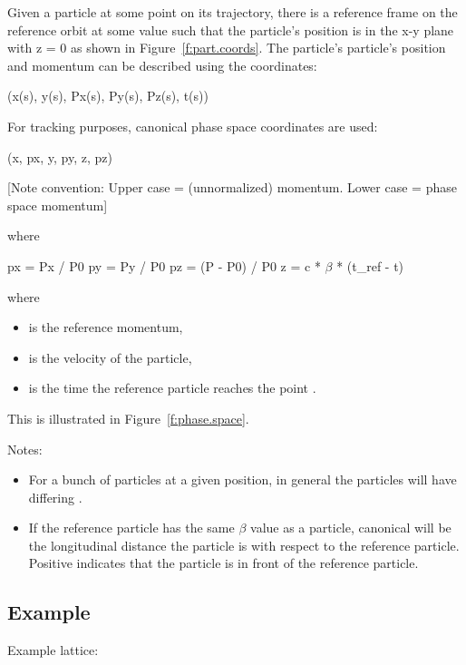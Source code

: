 \documentclass{hitec}
\begin{document}
Given a particle at some point on its trajectory, there is a reference frame on the reference orbit
at some  value such that the particle's position is in the x-y plane with z = 0 as shown
in Figure~\ref{f:part.coords}. The
particle's particle's position and momentum  can be described using the coordinates:
{\small
\begin{code}
    (x(s), y(s), Px(s), Py(s), Pz(s), t(s))
\end{code}}

For tracking purposes, canonical phase space coordinates are used:
{\small
\begin{code}
    (x, px, y, py, z, pz)   
\end{code}}
[Note convention: Upper case  = (unnormalized) momentum. Lower case  = phase space momentum]

where
{\small
\begin{code}
    px = Px / P0
    py = Py / P0
    pz = (P - P0) / P0
    z  = c * $\beta$ * (t_ref - t)
\end{code}}

where 
\begin{itemize}
\item {} is the reference momentum, 
\item \vn{$\beta$} is the velocity of the particle, 
\item {} is the time the reference particle reaches the point .
\end{itemize}

This is illustrated in Figure~\ref{f:phase.space}.

Notes:
\begin{itemize}
\item For a bunch of particles at a given  position, in general the particles will have differing .
\item If the reference particle has the same $\beta$ value as a particle, canonical  will be the longitudinal distance 
the particle is with respect to the reference particle. Positive  indicates that the particle
is in front of the reference particle.
\end{itemize}

\subsection{Example}

Example lattice:
\end{document}
